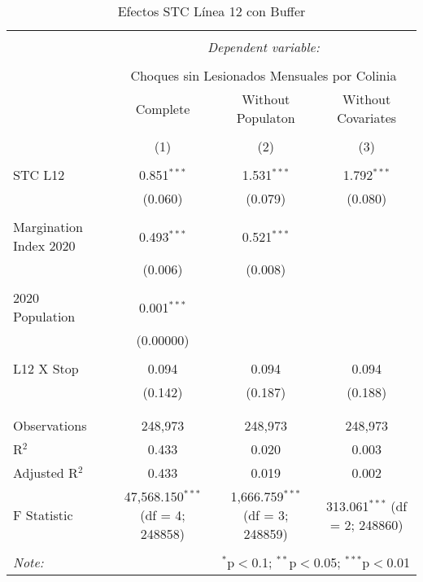 
\begin{table}[!htbp] \centering 
  \caption{Efectos STC Línea 12 con Buffer} 
  \label{} 
\begin{tabular}{@{\extracolsep{5pt}}lccc} 
\\[-1.8ex]\hline 
\hline \\[-1.8ex] 
 & \multicolumn{3}{c}{\textit{Dependent variable:}} \\ 
\cline{2-4} 
\\[-1.8ex] & \multicolumn{3}{c}{Choques sin Lesionados Mensuales por Colinia} \\ 
 & Complete & Without Populaton & Without Covariates \\ 
\\[-1.8ex] & (1) & (2) & (3)\\ 
\hline \\[-1.8ex] 
 STC L12 & 0.851$^{***}$ & 1.531$^{***}$ & 1.792$^{***}$ \\ 
  & (0.060) & (0.079) & (0.080) \\ 
  & & & \\ 
 Margination Index 2020 & 0.493$^{***}$ & 0.521$^{***}$ &  \\ 
  & (0.006) & (0.008) &  \\ 
  & & & \\ 
 2020 Population & 0.001$^{***}$ &  &  \\ 
  & (0.00000) &  &  \\ 
  & & & \\ 
 L12 X Stop & 0.094 & 0.094 & 0.094 \\ 
  & (0.142) & (0.187) & (0.188) \\ 
  & & & \\ 
\hline \\[-1.8ex] 
Observations & 248,973 & 248,973 & 248,973 \\ 
R$^{2}$ & 0.433 & 0.020 & 0.003 \\ 
Adjusted R$^{2}$ & 0.433 & 0.019 & 0.002 \\ 
F Statistic & 47,568.150$^{***}$ (df = 4; 248858) & 1,666.759$^{***}$ (df = 3; 248859) & 313.061$^{***}$ (df = 2; 248860) \\ 
\hline 
\hline \\[-1.8ex] 
\textit{Note:}  & \multicolumn{3}{r}{$^{*}$p$<$0.1; $^{**}$p$<$0.05; $^{***}$p$<$0.01} \\ 
\end{tabular} 
\end{table} 
